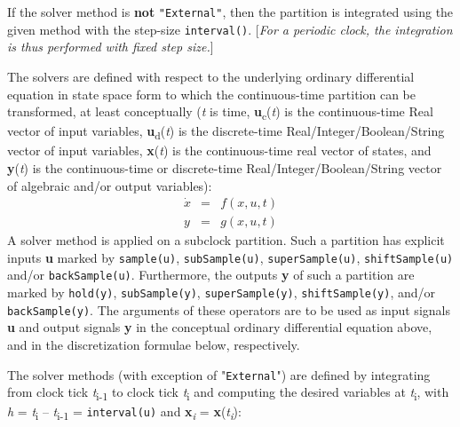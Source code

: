If the solver method is \textbf{not} \lstinline[basicstyle=\ttfamily]!"External"!, then the partition is
integrated using the given method with the step-size \lstinline[basicstyle=\ttfamily]!interval()!.
{[}\emph{For a periodic clock, the integration is thus performed with
fixed step size.}{]}

The solvers are defined with respect to the underlying ordinary
differential equation in state space form to which the continuous-time
partition can be transformed, at least conceptually (\emph{t} is time,
\textbf{u}\textsubscript{c}(\emph{t}) is the continuous-time Real vector
of input variables, \textbf{u}\textsubscript{d}(\emph{t}) is the
discrete-time Real/Integer/Boolean/String vector of input variables,
\textbf{x}(\emph{t}) is the continuous-time real vector of states, and
\textbf{y}(\emph{t}) is the continuous-time or discrete-time
Real/Integer/Boolean/String vector of algebraic and/or output
variables):
\begin{eqnarray*}
\dot{x}&=&f(x, u, t)\\
y&=&g(x, u, t)
\end{eqnarray*}
A solver method is applied on a subclock partition. Such a partition has
explicit inputs \textbf{u} marked by \lstinline[basicstyle=\ttfamily]!sample(u)!,
\lstinline[basicstyle=\ttfamily]!subSample(u)!, \lstinline[basicstyle=\ttfamily]!superSample(u)!, \lstinline[basicstyle=\ttfamily]!shiftSample(u)!
and/or \lstinline[basicstyle=\ttfamily]!backSample(u)!. Furthermore, the outputs \textbf{y} of
such a partition are marked by \lstinline[basicstyle=\ttfamily]!hold(y)!, \lstinline[basicstyle=\ttfamily]!subSample(y)!,
\lstinline[basicstyle=\ttfamily]!superSample(y)!, \lstinline[basicstyle=\ttfamily]!shiftSample(y)!, and/or
\lstinline[basicstyle=\ttfamily]!backSample(y)!. The arguments of these operators are to be used
as input signals \textbf{u} and output signals \textbf{y} in the
conceptual ordinary differential equation above, and in the
discretization formulae below, respectively.

The solver methods (with exception of "\lstinline[basicstyle=\ttfamily]!External!") are defined by
integrating from clock tick \emph{t}\textsubscript{i-1} to clock tick
\emph{t}\textsubscript{i} and computing the desired variables at
\emph{t}\textsubscript{i}, with \emph{h} = \emph{t}\textsubscript{i} --
\emph{t}\textsubscript{i-1} = \lstinline[basicstyle=\ttfamily]!interval(u)! and
\textbf{x}\emph{\textsubscript{i}} =
\textbf{x}(\emph{t\textsubscript{i}}):

